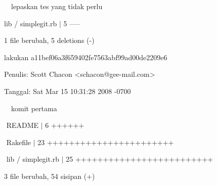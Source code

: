  \vspace{\baselineskip}
\noindent 
 \hspace*{0.5in}  $  $ $  $ $  $ $  $lepaskan tes yang tidak perlu \par
\noindent 
 \hspace*{0.5in}  $  $lib / simplegit.rb  $  \vert  $ 5 ----- \par
\noindent 
 \hspace*{0.5in}  $  $1 file berubah, 5 deletions (-) \par
 \vspace{\baselineskip}
\noindent 
 \hspace*{0.5in} lakukan a11bef06a3f659402fe7563abf99ad00de2209e6 \par
\noindent 
 \hspace*{0.5in} Penulis: Scott Chacon <schacon@gee-mail.com> \par
\noindent 
 \hspace*{0.5in} Tanggal: Sat Mar 15 10:31:28 2008 -0700 \par
 \vspace{\baselineskip}
\noindent 
 \hspace*{0.5in}  $  $ $  $ $  $ $  $komit pertama \par
\noindent 
 $  $ \hspace*{0.5in}  \hspace*{0.5in} README  $  \vert  $ 6 ++++++ \par
\noindent 
 \hspace*{0.5in}  $  $ \hspace*{0.5in} Rakefile  $  \vert  $ 23 +++++++++++++++++++++++ \par
\noindent 
 $  $ \hspace*{0.5in}  \hspace*{0.5in} lib / simplegit.rb  $  \vert  $ 25 +++++++++++++++++++++++++ \par
\noindent 
 \hspace*{0.5in}  \hspace*{0.5in}  $  $3 file berubah, 54 sisipan (+) \par

